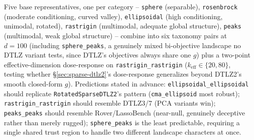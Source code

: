 \documentclass[11pt]{article}
\begin{document}
Five base representatives, one per category -- \texttt{sphere}
(separable), \texttt{rosenbrock} (moderate conditioning, curved valley),
\texttt{ellipsoidal} (high conditioning, unimodal, rotated),
\texttt{rastrigin} (multimodal, adequate global structure), \texttt{peaks}
(multimodal, weak global structure) -- combine into six taxonomy pairs at
$d{=}100$ (including \texttt{sphere\_peaks}, a genuinely mixed
bi-objective landscape no DTLZ variant tests, since DTLZ's objectives
always share one $g$) plus a two-point effective-dimension dose-response
on \texttt{rastrigin\_rastrigin} ($k_{\mathrm{eff}} \in \{20, 80\}$,
testing whether \S\ref{sec:sparse-dtlz2}'s dose-response generalizes
beyond DTLZ2's smooth closed-form $g$). Predictions stated in advance:
\texttt{ellipsoidal\_ellipsoidal} should replicate
\texttt{RotatedSparseDTLZ2}'s pattern (\texttt{cma\_ellipsoid} most
robust); \texttt{rastrigin\_rastrigin} should resemble DTLZ3/7 (PCA
variants win); \texttt{peaks\_peaks} should resemble Rover/LassoBench
(near-null, genuinely deceptive rather than merely rugged);
\texttt{sphere\_peaks} is the least predictable, requiring a single shared
trust region to handle two different landscape characters at once.
\end{document}
